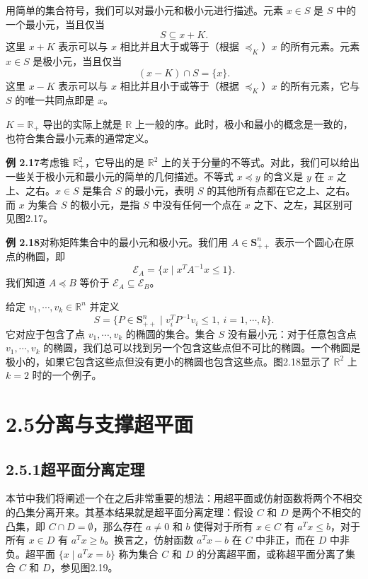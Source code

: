 \documentclass[UTF8, 12pt, fontset=fandol, oneside]{ctexart}
\begin{document}
用简单的集合符号，我们可以对最小元和极小元进行描述。元素 $x\in S$ 是 $S$ 中的一个最小元，当且仅当
\[
  S\subseteq x+K.
\]
这里 $x+K$ 表示可以与 $x$ 相比并且大于或等于（根据 $\preceq_K$）$x$ 的所有元素。元素 $x\in S$ 是极小元，当且仅当
\[
  (x-K)\cap S=\{x\}.
\]
这里 $x-K$ 表示可以与 $x$ 相比并且小于或等于（根据 $\preceq_K$）$x$ 的所有元素，它与 $S$ 的唯一共同点即是 $x$。

$K=\mathbb{R}_+$ 导出的实际上就是 $\mathbb{R}$ 上一般的序。此时，极小和最小的概念是一致的，也符合集合最小元素的通常定义。

\noindent\textbf{例 2.17}\quad 考虑锥 $\mathbb{R}_+^2$，它导出的是 $\mathbb{R}^2$ 上的关于分量的不等式。对此，我们可以给出一些关于极小元和最小元的简单的几何描述。不等式 $x\preceq y$ 的含义是 $y$ 在 $x$ 之上、之右。$x\in S$ 是集合 $S$ 的最小元，表明 $S$ 的其他所有点都在它之上、之右。而 $x$ 为集合 $S$ 的极小元，是指 $S$ 中没有任何一个点在 $x$ 之下、之左，其区别可见图2.17。

\noindent\textbf{例 2.18}\quad 对称矩阵集合中的最小元和极小元。我们用 $A\in\mathbf{S}_{++}^n$ 表示一个圆心在原点的椭圆，即
\[
  \mathcal{E}_A=\{x\mid x^TA^{-1}x\le 1\}.
\]
我们知道 $A\preceq B$ 等价于 $\mathcal{E}_A\subseteq\mathcal{E}_B$。

给定 $v_1,\cdots,v_k\in\mathbb{R}^n$ 并定义
\[
  S=\{P\in\mathbf{S}_{++}^n\mid v_i^TP^{-1}v_i\le 1,\ i=1,\cdots,k\}.
\]
它对应于包含了点 $v_1,\cdots,v_k$ 的椭圆的集合。集合 $S$ 没有最小元：对于任意包含点 $v_1,\cdots,v_k$ 的椭圆，我们总可以找到另一个包含这些点但不可比的椭圆。一个椭圆是极小的，如果它包含这些点但没有更小的椭圆也包含这些点。图2.18显示了 $\mathbb{R}^2$ 上 $k=2$ 时的一个例子。

\section*{2.5\quad 分离与支撑超平面}

\subsection*{2.5.1\quad 超平面分离定理}

本节中我们将阐述一个在之后非常重要的想法：用超平面或仿射函数将两个不相交的凸集分离开来。其基本结果就是超平面分离定理：假设 $C$ 和 $D$ 是两个不相交的凸集，即 $C\cap D=\emptyset$，那么存在 $a\ne 0$ 和 $b$ 使得对于所有 $x\in C$ 有 $a^Tx\le b$，对于所有 $x\in D$ 有 $a^Tx\ge b$。换言之，仿射函数 $a^Tx-b$ 在 $C$ 中非正，而在 $D$ 中非负。超平面 $\{x\mid a^Tx=b\}$ 称为集合 $C$ 和 $D$ 的分离超平面，或称超平面分离了集合 $C$ 和 $D$，参见图2.19。
\end{document}
